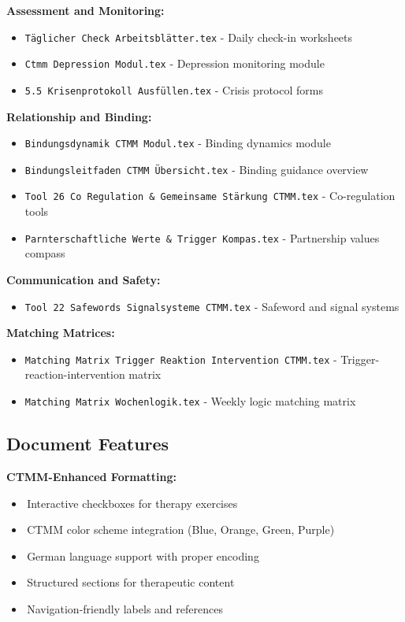 \textbf{Assessment and Monitoring:}
\begin{itemize}
    \item \texttt{Täglicher Check Arbeitsblätter.tex} - Daily check-in worksheets
    \item \texttt{Ctmm Depression Modul.tex} - Depression monitoring module
    \item \texttt{5.5 Krisenprotokoll Ausfüllen.tex} - Crisis protocol forms
\end{itemize}

\textbf{Relationship and Binding:}
\begin{itemize}
    \item \texttt{Bindungsdynamik CTMM Modul.tex} - Binding dynamics module
    \item \texttt{Bindungsleitfaden CTMM Übersicht.tex} - Binding guidance overview
    \item \texttt{Tool 26 Co Regulation \& Gemeinsame Stärkung CTMM.tex} - Co-regulation tools
    \item \texttt{Parnterschaftliche Werte \& Trigger Kompas.tex} - Partnership values compass
\end{itemize}

\textbf{Communication and Safety:}
\begin{itemize}
    \item \texttt{Tool 22 Safewords Signalsysteme CTMM.tex} - Safeword and signal systems
\end{itemize}

\textbf{Matching Matrices:}
\begin{itemize}
    \item \texttt{Matching Matrix Trigger Reaktion Intervention CTMM.tex} - Trigger-reaction-intervention matrix
    \item \texttt{Matching Matrix Wochenlogik.tex} - Weekly logic matching matrix
\end{itemize}

\subsection{Document Features}

\textbf{CTMM-Enhanced Formatting:}
\begin{itemize}
    \item \checkbox\,Interactive checkboxes for therapy exercises
    \item \checkbox\,CTMM color scheme integration (Blue, Orange, Green, Purple)
    \item \checkbox\,German language support with proper encoding
    \item \checkbox\,Structured sections for therapeutic content
    \item \checkbox\,Navigation-friendly labels and references
\end{itemize}

